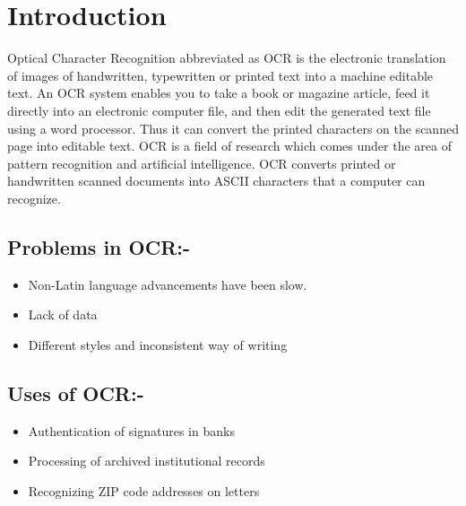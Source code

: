 \chapter{Introduction}
\label{intro}

Optical Character Recognition abbreviated as OCR is the electronic translation of images of handwritten, typewritten or printed text into a machine editable text. An OCR system enables you to take a book or magazine article, feed it directly into an electronic computer file, and then edit the generated text file using a word processor. Thus it can convert the printed characters on the scanned page into editable text. OCR is a field of research which comes under the area of pattern recognition and artificial intelligence. OCR converts printed or handwritten scanned documents into ASCII characters that a computer can recognize.
\section{Problems in OCR:-}
\begin{itemize}
\item Non-Latin language advancements have been slow. 
\item Lack of data
\item Different styles and inconsistent way of writing
\end{itemize}

\section{Uses of OCR:-}
\begin{itemize}
\item Authentication of signatures in banks
\item Processing of archived institutional records
\item Recognizing ZIP code addresses on letters
\end{itemize}
